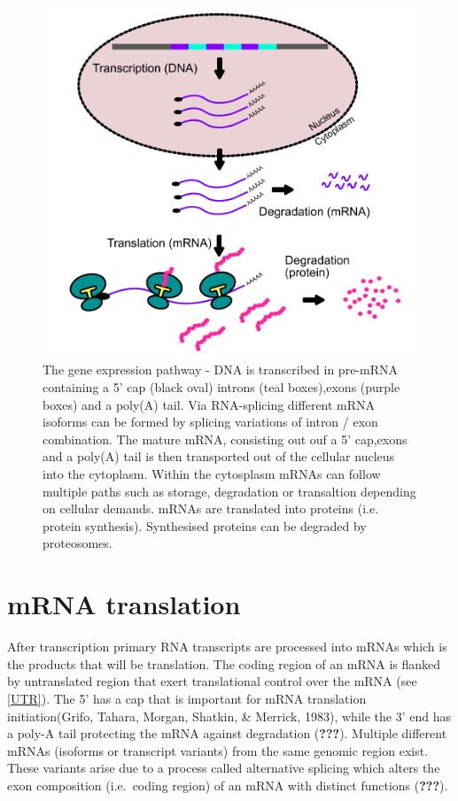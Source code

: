 \documentclass[12pt,openany]{book}
\begin{document}
\begin{figure}
  \includegraphics{./figures/geneExprPath_2.pdf}
  \caption{The gene expression pathway - DNA is transcribed in pre-mRNA containing a 5' cap (black oval) introns (teal boxes),exons (purple boxes) and a poly(A) tail. Via RNA-splicing different mRNA isoforms can be formed by splicing variations of intron / exon combination. The mature mRNA, consisting out ouf a 5' cap,exons and a poly(A) tail is then transported out of the cellular nucleus into the cytoplasm. Within the cytosplasm mRNAs can follow multiple paths such as storage, degradation or transaltion depending on cellular demands. mRNAs are translated into proteins (i.e. protein synthesis). Synthesised proteins can be degraded by proteosomes. \label{fig:geneExprPath}}
\end{figure}

\section{mRNA translation}

After transcription primary RNA transcripts are processed into mRNAs
which is the products that will be translation. The coding region of an
mRNA is flanked by untranslated region that exert translational control
over the mRNA (see \ref{UTR}). The 5' has a cap that is important for
mRNA translation initiation(Grifo, Tahara, Morgan, Shatkin, \& Merrick,
1983), while the 3' end has a poly-A tail protecting the mRNA against
degradation ({\textbf{???}}). Multiple different mRNAs (isoforms or
transcript variants) from the same genomic region exist. These variants
arise due to a process called alternative splicing which alters the exon
composition (i.e.~coding region) of an mRNA with distinct functions
({\textbf{???}}).
\end{document}
